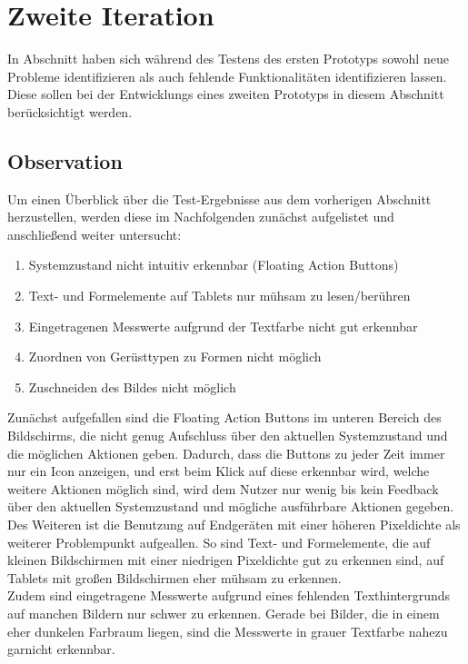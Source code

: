 \section{Zweite Iteration}

In Abschnitt  haben sich während des Testens des ersten Prototyps sowohl neue Probleme identifizieren als auch fehlende Funktionalitäten identifizieren lassen.
Diese sollen bei der Entwicklungs eines zweiten Prototyps in diesem Abschnitt berücksichtigt werden. \\

\subsection{Observation}
Um einen Überblick über die Test-Ergebnisse aus dem vorherigen Abschnitt herzustellen, werden diese im Nachfolgenden zunächst aufgelistet und anschließend weiter untersucht:

\begin{enumerate}
  \item Systemzustand nicht intuitiv erkennbar (Floating Action Buttons)
  \item Text- und Formelemente auf Tablets nur mühsam zu lesen/berühren
  \item Eingetragenen Messwerte aufgrund der Textfarbe nicht gut erkennbar
  \item Zuordnen von Gerüsttypen zu Formen nicht möglich
  \item Zuschneiden des Bildes nicht möglich
\end{enumerate}

\noindent
Zunächst aufgefallen sind die Floating Action Buttons im unteren Bereich des Bildschirms, die nicht genug Aufschluss über den aktuellen Systemzustand und die möglichen Aktionen geben.
Dadurch, dass die Buttons zu jeder Zeit immer nur ein Icon anzeigen, und erst beim Klick auf diese erkennbar wird, welche weitere Aktionen möglich sind, wird dem Nutzer nur wenig bis kein Feedback über den aktuellen Systemzustand und mögliche ausführbare Aktionen gegeben. \\

Des Weiteren ist die Benutzung auf Endgeräten mit einer höheren Pixeldichte als weiterer Problempunkt aufgeallen.
So sind Text- und Formelemente, die auf kleinen Bildschirmen mit einer niedrigen Pixeldichte gut zu erkennen sind, auf Tablets mit großen Bildschirmen eher mühsam zu erkennen. \\

Zudem sind eingetragene Messwerte aufgrund eines fehlenden Texthintergrunds auf manchen Bildern nur schwer zu erkennen.
Gerade bei Bilder, die in einem eher dunkelen Farbraum liegen, sind die Messwerte in grauer Textfarbe nahezu garnicht erkennbar. \\

